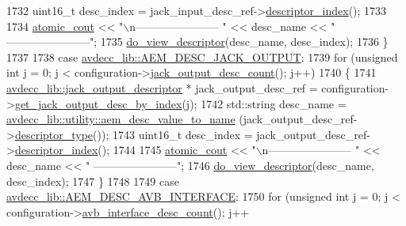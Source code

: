 \begin{DoxyCode}
1732             uint16\_t desc\_index = jack\_input\_desc\_ref->\hyperlink{classavdecc__lib_1_1descriptor__base_a7eed5583bffdf72d89021b188648c1b5}{descriptor\_index}();
1733 
1734             \hyperlink{cmd__line_8h_a0bc38ccc65c79ba06c6fcd7b4bf554c3}{atomic\_cout} << \textcolor{stringliteral}{"\(\backslash\)n----------------------- "} << desc\_name << \textcolor{stringliteral}{"
       -----------------------"};
1735             \hyperlink{classcmd__line_aef7d9f8c4eff85c46e5b7aea0961bb51}{do\_view\_descriptor}(desc\_name, desc\_index);
1736         \}
1737 
1738     \textcolor{keywordflow}{case} \hyperlink{namespaceavdecc__lib_ac7b7d227e46bc72b63ee9e9aae15902fab14c53680e2a06bc1fdd35ae57e30de9}{avdecc\_lib::AEM\_DESC\_JACK\_OUTPUT}:
1739         \textcolor{keywordflow}{for} (\textcolor{keywordtype}{unsigned} \textcolor{keywordtype}{int} j = 0; j < configuration->\hyperlink{classavdecc__lib_1_1configuration__descriptor_aaf9f94d8037864a664f7d3e267df6dd7}{jack\_output\_desc\_count}(); j++)
1740         \{
1741             \hyperlink{classavdecc__lib_1_1jack__output__descriptor}{avdecc\_lib::jack\_output\_descriptor} * jack\_output\_desc\_ref = 
      configuration->\hyperlink{classavdecc__lib_1_1configuration__descriptor_ae6a68f83733b54540614b729548a180b}{get\_jack\_output\_desc\_by\_index}(j);
1742             std::string desc\_name = \hyperlink{namespaceavdecc__lib_1_1utility_a6bdd02679e5a911a071d4aa03be341f0}{avdecc\_lib::utility::aem\_desc\_value\_to\_name}
      (jack\_output\_desc\_ref->\hyperlink{classavdecc__lib_1_1descriptor__base_a5112b70022171063ec5d3242bee9910e}{descriptor\_type}());
1743             uint16\_t desc\_index = jack\_output\_desc\_ref->\hyperlink{classavdecc__lib_1_1descriptor__base_a7eed5583bffdf72d89021b188648c1b5}{descriptor\_index}();
1744 
1745             \hyperlink{cmd__line_8h_a0bc38ccc65c79ba06c6fcd7b4bf554c3}{atomic\_cout} << \textcolor{stringliteral}{"\(\backslash\)n----------------------- "} << desc\_name << \textcolor{stringliteral}{"
       -----------------------"};
1746             \hyperlink{classcmd__line_aef7d9f8c4eff85c46e5b7aea0961bb51}{do\_view\_descriptor}(desc\_name, desc\_index);
1747         \}
1748 
1749     \textcolor{keywordflow}{case} \hyperlink{namespaceavdecc__lib_ac7b7d227e46bc72b63ee9e9aae15902fa5c354fe160628ac90da9257d8e0cb0ee}{avdecc\_lib::AEM\_DESC\_AVB\_INTERFACE}:
1750         \textcolor{keywordflow}{for} (\textcolor{keywordtype}{unsigned} \textcolor{keywordtype}{int} j = 0; j < configuration->\hyperlink{classavdecc__lib_1_1configuration__descriptor_aadd99a4b7397158e900eca5791b773bf}{avb\_interface\_desc\_count}(); j++

\end{DoxyCode}
